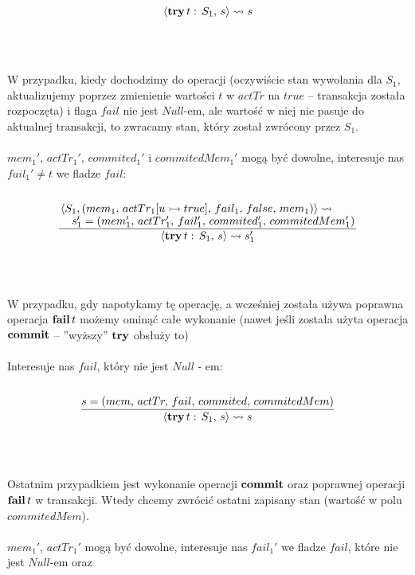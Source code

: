 \documentclass{article}
\begin{document}
\begin{itemize}
\[{{            }
         } {
            \langle {\bf try} \, t: \, S_1, \, s \rangle
            \leadsto s
         }
      \]
      \\ \\ \\
      W przypadku, kiedy dochodzimy do operacji
      (oczywiście stan wywołania dla $S_1$, aktualizujemy poprzez zmienienie wartości $t$ w $actTr$ na $true$
      -- transakcja została rozpoczęta)
      i flaga $fail$ nie jest $Null$-em, ale wartość w niej nie pasuje do aktualnej transakcji,
      to zwracamy stan, który został zwrócony przez $S_1$.
      \\ \\
      $mem_1'$, $actTr_1'$, $commited_1'$ i $commitedMem_1'$ mogą być dowolne, interesuje nas $fail_1' \ne t$ we fladze $fail$:
      \\ \\
      \[
         \frac {
            \splitfrac {
               \langle S_1, (mem_1, \, actTr_1[u \rightarrowtail true], \, fail_1, \, false, \, mem_1) \rangle
               \leadsto
            } {
               s_1' = (mem_1', \, actTr_1', \, fail_1', \, commited_1', \, commitedMem_1')
            }
         } {
            \langle {\bf try} \, t: \, S_1, \, s \rangle
            \leadsto s_1'
         }
      \]
      \\ \\ \\
      W przypadku, gdy napotykamy tę operację, a wcześniej została używa poprawna operacja ${\bf fail} \, t$
      możemy ominąć całe wykonanie (nawet jeśli została użyta operacja ${\bf commit}$ -- ''wyższy'' ${\bf try}$ obsłuży to)
      \\ \\
      Interesuje nas $fail$, który nie jest $Null$ - em:
      \\ \\
      \[
         \frac {
            s = (mem, \, actTr, \, fail, \, commited, \, commitedMem)
         } {
            \langle {\bf try} \, t: \, S_1, \, s \rangle
            \leadsto s
         }
      \]
      \\ \\ \\
      Ostatnim przypadkiem jest wykonanie operacji ${\bf commit}$ oraz poprawnej operacji ${\bf fail} \, t$ w transakcji.
      Wtedy chcemy zwrócić ostatni zapisany stan (wartość w polu $commitedMem$).
      \\ \\
      $mem_1'$, $actTr_1'$ mogą być dowolne, interesuje nas $fail_1'$ we fladze $fail$, które nie jest $Null$-em oraz

\end{itemize}
\end{document}
